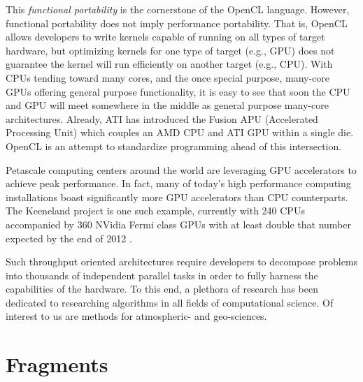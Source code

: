 \documentclass[11pt]{report}
\begin{document}
This \textit{functional portability} is the cornerstone of the OpenCL language. However, functional portability does not imply performance portability. That is, OpenCL allows developers to write kernels capable of running on all types of target hardware, but optimizing kernels for one type of target (e.g., GPU) does not guarantee the kernel will run efficiently on another target (e.g., CPU).
With CPUs tending toward many cores, and the once special purpose, many-core GPUs offering general purpose functionality, it is easy to see that soon the CPU and GPU will meet somewhere in the middle as general purpose many-core architectures. Already, ATI has introduced the Fusion APU (Accelerated Processing Unit) which couples an AMD CPU and ATI GPU within a single die. OpenCL is an attempt to standardize programming ahead of this intersection. 


Petascale computing centers around the world are leveraging GPU accelerators to achieve peak performance. In fact, many of today's high performance computing installations boast significantly more GPU accelerators than CPU counterparts. The Keeneland project is one such example, currently with 240 CPUs accompanied by 360 NVidia Fermi class GPUs with at least double that number expected by the end of 2012 \cite{Vetter2011}. 

Such throughput oriented architectures require developers to decompose problems into thousands of independent parallel tasks in order to fully harness the capabilities of the hardware. To this end, a plethora of research has been dedicated to researching algorithms in all fields of computational science. Of interest to us are methods for atmospheric- and geo-sciences. 


\section{Fragments} 
\end{document}
